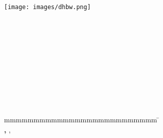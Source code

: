 
\begin{titlepage}
	\begin{center}
	    \texttt{[image: images/dhbw.png]}	    
	\end{center}

	\enlargethispage{20mm}
	\begin{center}
		\vspace*{12mm}	{\LARGE\textbf \titel }\\
		\vspace*{12mm}	{\large\textbf \arbeit}\\
		\vspace*{12mm}	\langdeckblattabschlusshinleitung\\
		\vspace*{3mm}		{\textbf \abschluss}\\
		\vspace*{12mm}	\langartikelstudiengang{} \langstudiengang{} \studiengang\\
		\vspace*{3mm}		\langanderdh{} \dhbw\\
		\vspace*{12mm}	\langvon\\
		\vspace*{3mm}		{\large\textbf \autor}\\
		\vspace*{12mm}	\datumAbgabe\\
		\vspace*{12mm}
	\end{center}
	\vfill
	\begin{spacing}{1.2}
		\begin{tabbing}
			mmmmmmmmmmmmmmmmmmmmmmmmmm             \= \kill
			\textbf{\langdbbearbeitungszeit}       \>  \zeitraum\\
			\textbf{\langdbmatriknr, \langdbkurs}  \>  \martrikelnr, \kurs\\
			\textbf{\langdbbetreuer}               \>  \betreuer\\
		\end{tabbing}
	\end{spacing}
\end{titlepage}
